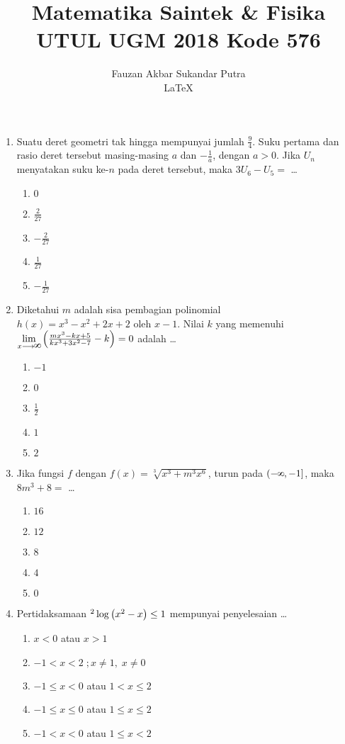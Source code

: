 \documentclass[A4,12PT, english, twocolumn]{journal}
\title{Matematika Saintek \& Fisika UTUL UGM 2018 Kode 576}
\author{Fauzan Akbar Sukandar Putra \\ \LaTeX}
\def\infinity{\rotatebox{90}{8}}
\begin{document}
\maketitle

\begin{enumerate}
\item Suatu deret geometri tak hingga mempunyai jumlah $\frac{9}{4}$. Suku pertama dan rasio deret tersebut masing-masing $a$ dan $- \frac{1}{a}$, dengan $a>0$. Jika $U_n$ menyatakan suku ke-$n$ pada deret tersebut, maka $3U_6-U_5=$ \dots
    \begin{enumerate}
        \item $0$
        \item $\frac{2}{27}$
        \item $-\frac{2}{27}$
        \item $\frac{1}{27}$
        \item $-\frac{1}{27}$
    \end{enumerate}
  
\item Diketahui $m$ adalah sisa pembagian polinomial \\ $h \left(x \right) = x^3-x^2+2x+2$ oleh $x-1$. Nilai $k$ yang memenuhi $\lim\limits_{x \longrightarrow \infinity} {\left(\frac{mx^3-kx+5}{kx^3+3x^2-7}-k \right) = 0}$ adalah \dots
    \begin{enumerate}
        \item $-1$
        \item $0$
        \item $\frac{1}{2}$
        \item $1$
        \item $2$
    \end{enumerate}
     
\item Jika fungsi $f$ dengan $f \left(x \right) = \sqrt[3]{x^3+m^3x^6}$, turun pada $\left(-\infinity, -1 \right]$, maka $8m^3+8=$ \dots
    \begin{enumerate}
        \item $16$
        \item $12$
        \item $8$
        \item $4$
        \item $0$
    \end{enumerate}
   
\item Pertidaksamaan $^2\Log{\left(x^2-x \right)} \leq 1$ mempunyai penyelesaian \dots
    \begin{enumerate}
        \item $x<0$ atau $x>1$
        \item $-1<x<2 \; ; x \neq 1, \; x \neq 0$
        \item $-1 \leq x<0$ atau $1<x \leq 2$
        \item $-1 \leq x \leq 0$ atau $1 \leq x \leq 2$
        \item $-1<x<0$ atau $1 \leq x < 2$
    \end{enumerate}


\end{enumerate}
\end{document}
